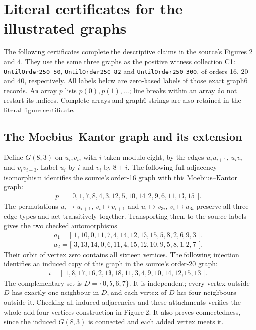 \section{Literal certificates for the illustrated graphs}\label{sec:figures}
The following certificates complete the descriptive claims in the
source's Figures 2 and 4. They use the same three graphs as the positive
witness collection C1: \texttt{UntilOrder250\_50},
\texttt{UntilOrder250\_82} and \texttt{UntilOrder250\_300}, of orders
16, 20 and 40, respectively. All labels below are zero-based labels of
those exact graph6 records. An array $p$ lists $p(0),p(1),\ldots$;
line breaks within an array do not restart its indices. Complete arrays
and graph6 strings are also retained in the literal figure certificate.

\subsection{The Moebius--Kantor graph and its extension}
Define $G(8,3)$ on $u_i,v_i$, with $i$ taken modulo eight, by the edges
$u_iu_{i+1}$, $u_iv_i$ and $v_iv_{i+3}$. Label $u_i$ by $i$ and $v_i$
by $8+i$. The following full adjacency isomorphism identifies the
source's order-16 graph with this Moebius--Kantor graph:
\[
p=\bigl[\begin{gathered}
0,1,7,8,4,3,12,5,10,14,2,9,6,11,13,15
\end{gathered}\bigr].
\]
The permutations $u_i\mapsto u_{i+1}$, $v_i\mapsto v_{i+1}$
and $u_i\mapsto v_{3i}$, $v_i\mapsto u_{3i}$ preserve all three edge
types and act transitively together. Transporting them to the source
labels gives the two checked automorphisms
\[
a_1=\bigl[\begin{gathered}
1,10,0,11,7,4,14,12,13,15,5,8,2,6,9,3
\end{gathered}\bigr].
\]
\[
a_2=\bigl[\begin{gathered}
3,13,14,0,6,11,4,15,12,10,9,5,8,1,2,7
\end{gathered}\bigr].
\]
Their orbit of vertex zero contains all sixteen vertices. The following
injection identifies an induced copy of this graph in the source's
order-20 graph:
\[
\iota=\bigl[\begin{gathered}
1,8,17,16,2,19,18,11,3,4,9,10,14,12,15,13
\end{gathered}\bigr].
\]
The complementary set is $D=\{0,5,6,7\}$. It is independent;
every vertex outside $D$ has exactly one neighbour in $D$, and each
vertex of $D$ has four neighbours outside it. Checking all induced
adjacencies and these attachments verifies the whole add-four-vertices
construction in Figure 2. It also proves connectedness, since the
induced $G(8,3)$ is connected and each added vertex meets it.

